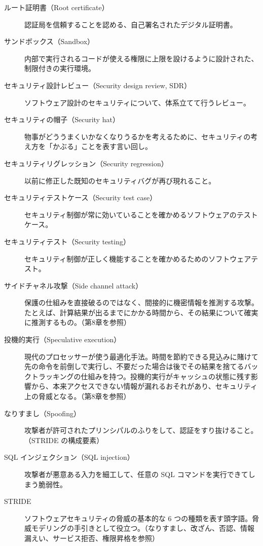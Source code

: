 \documentclass[uplatex]{jsarticle}
\begin{document}
\begin{description}
\item[ルート証明書（Root certificate）]
認証局を信頼することを認める、自己署名されたデジタル証明書。

\item[サンドボックス（Sandbox）]
内部で実行されるコードが使える権限に上限を設けるように設計された、制限付きの実行環境。

\item[セキュリティ設計レビュー（Security design review, SDR）]
ソフトウェア設計のセキュリティについて、体系立てて行うレビュー。

\item[セキュリティの帽子（Security hat）]
物事がどううまくいかなくなりうるかを考えるために、セキュリティの考え方を「かぶる」ことを表す言い回し。

\item[セキュリティリグレッション（Security regression）]
以前に修正した既知のセキュリティバグが再び現れること。

\item[セキュリティテストケース（Security test case）]
セキュリティ制御が常に効いていることを確かめるソフトウェアのテストケース。

\item[セキュリティテスト（Security testing）]
セキュリティ制御が正しく機能することを確かめるためのソフトウェアテスト。

\item[サイドチャネル攻撃（Side channel attack）]
保護の仕組みを直接破るのではなく、間接的に機密情報を推測する攻撃。たとえば、計算結果が出るまでにかかる時間から、その結果について確実に推測するもの。（第8章を参照）

\item[投機的実行（Speculative execution）]
現代のプロセッサーが使う最適化手法。時間を節約できる見込みに賭けて先の命令を前倒しで実行し、不要だった場合は後でその結果を捨てるバックトラッキングの仕組みを持つ。投機的実行がキャッシュの状態に残す影響から、本来アクセスできない情報が漏れるおそれがあり、セキュリティ上の脅威となる。（第8章を参照）

\item[なりすまし（Spoofing）]
攻撃者が許可されたプリンシパルのふりをして、認証をすり抜けること。（STRIDE の構成要素）

\item[SQL インジェクション（SQL injection）]
攻撃者が悪意ある入力を細工して、任意の SQL コマンドを実行できてしまう脆弱性。

\item[STRIDE]
ソフトウェアセキュリティの脅威の基本的な 6 つの種類を表す頭字語。脅威モデリングの手引きとして役立つ。（なりすまし、改ざん、否認、情報漏えい、サービス拒否、権限昇格を参照）


\end{description}
\end{document}
